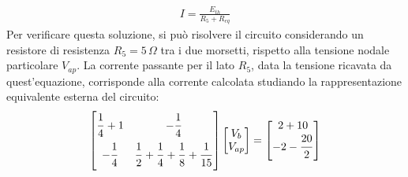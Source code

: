 \documentclass{article}
\numberwithin{equation}{subsection}
\begin{document}
\begin{gather*}
    I=\displaystyle\frac{E_{th}}{R_5+R_{eq}}
\end{gather*}
Per verificare questa soluzione, si può risolvere il circuito considerando un resistore di resistenza $R_5=5\,\Omega$ tra i due morsetti, rispetto alla tensione nodale 
particolare $V_{ap}$. La corrente passante per il lato $R_5$, data la tensione ricavata da quest'equazione, corrisponde alla corrente calcolata studiando la rappresentazione 
equivalente esterna del circuito:
\begin{gather*}
    \begin{bmatrix}
        \displaystyle\frac{\strut 1}{\strut 4}+1&-\displaystyle\frac{\strut 1}{\strut 4}\\
        \displaystyle-\frac{\strut 1}{\strut 4}&\displaystyle\frac{\strut 1}{\strut 2}+\frac{\strut 1}{\strut 4}+\frac{\strut 1}{\strut 8}+\frac{\strut 1}{\strut 15}
    \end{bmatrix}\begin{bmatrix}
        V_b\\
        V_{ap}
    \end{bmatrix}=\begin{bmatrix}
        2+10\\
        -2-\displaystyle\frac{\strut 20}{\strut 2}
    \end{bmatrix}
\end{gather*}
\end{document}
